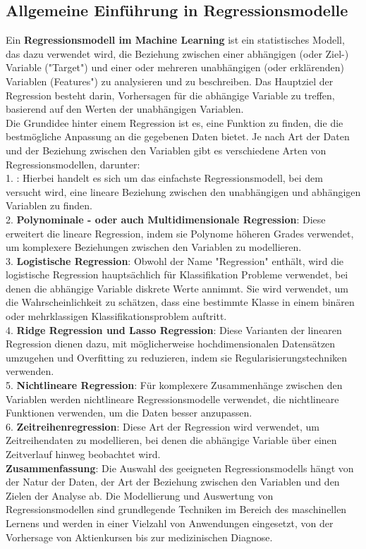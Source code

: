 \documentclass[12pt]{article}
\begin{document}
\subsection{Allgemeine Einführung in Regressionsmodelle}

Ein \textbf{Regressionsmodell im Machine Learning} ist ein statistisches Modell, das dazu verwendet wird, die Beziehung zwischen einer abhängigen (oder Ziel-) Variable ("Target") und einer oder mehreren unabhängigen (oder erklärenden) Variablen (Features") zu analysieren und zu beschreiben. Das Hauptziel der Regression besteht darin, Vorhersagen für die abhängige Variable zu treffen, basierend auf den Werten der unabhängigen Variablen.\\
Die Grundidee hinter einem Regression ist es, eine Funktion zu finden, die die bestmögliche Anpassung an die gegebenen Daten bietet. Je nach Art der Daten und der Beziehung zwischen den Variablen gibt es verschiedene Arten von Regressionsmodellen, darunter:\\[0.2cm] 
% 
1. \textbf{{\color{blue}{Lineare Regression}}}:  Hierbei handelt es sich um das einfachste Regressionsmodell, bei dem versucht wird, eine lineare Beziehung zwischen den unabhängigen und abhängigen Variablen zu finden.\\[0.2cm]
%  
2. \textbf{Polynominale - oder auch Multidimensionale Regression}: Diese erweitert die lineare Regression, indem sie Polynome höheren Grades verwendet, um komplexere Beziehungen zwischen den Variablen zu modellieren.\\[0.2cm]
% 
3. \textbf{Logistische Regression}: Obwohl der Name "Regression" enthält, wird die logistische Regression hauptsächlich für Klassifikation Probleme verwendet, bei denen die abhängige Variable diskrete Werte annimmt. Sie wird verwendet, um die Wahrscheinlichkeit zu schätzen, dass eine bestimmte Klasse in einem binären oder mehrklassigen Klassifikationsproblem auftritt.\\[0.2cm]
%  
4. \textbf{Ridge Regression und Lasso Regression}: Diese Varianten der linearen Regression dienen dazu, mit möglicherweise hochdimensionalen Datensätzen umzugehen und Overfitting zu reduzieren, indem sie Regularisierungstechniken verwenden.\\[0.2cm] 
% 
5. \textbf{Nichtlineare Regression}: Für komplexere Zusammenhänge zwischen den Variablen werden nichtlineare Regressionsmodelle verwendet, die nichtlineare Funktionen verwenden, um die Daten besser anzupassen.\\[0.2cm]
% 
6. \textbf{Zeitreihenregression}: Diese Art der Regression wird verwendet, um Zeitreihendaten zu modellieren, bei denen die abhängige Variable über einen Zeitverlauf hinweg beobachtet wird.\\[0.2cm]
% 
\textbf{Zusammenfassung}: Die Auswahl des geeigneten Regressionsmodells hängt von der Natur der Daten, der Art der Beziehung zwischen den Variablen und den Zielen der Analyse ab. Die Modellierung und Auswertung von Regressionsmodellen sind grundlegende Techniken im Bereich des maschinellen Lernens und werden in einer Vielzahl von Anwendungen eingesetzt, von der Vorhersage von Aktienkursen bis zur medizinischen Diagnose. 
\end{document}
